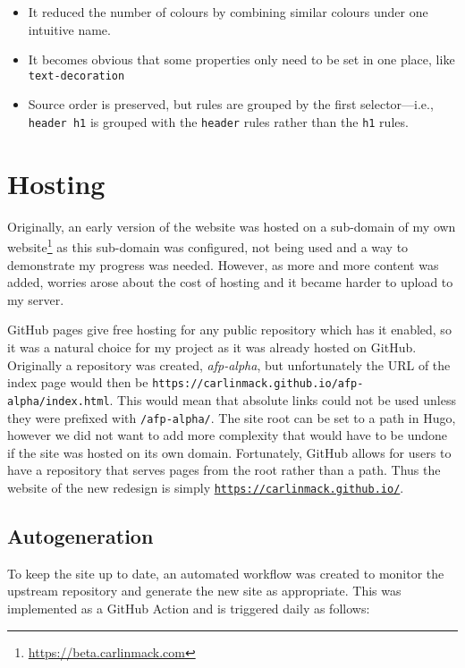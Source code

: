 \documentclass[bsc,frontabs,oneside,singlespacing,parskip,deptreport,logo]{infthesis}
\begin{document}
\begin{itemize}
    \item It reduced the number of colours by combining similar colours under one intuitive name.
    \item It becomes obvious that some properties only need to be set in one place, like \verb|text-decoration|
    \item Source order is preserved, but rules are grouped by the first selector---i.e., \verb|header h1| is grouped with the \verb|header| rules rather than the \verb|h1| rules. %
\end{itemize}

\section{Hosting}

Originally, an early version of the website was hosted on a sub-domain of my own website\footnote{\url{https://beta.carlinmack.com}} as this sub-domain was configured, not being used and a way to demonstrate my progress was needed. However, as more and more content was added, worries arose about the cost of hosting and it became harder to upload to my server.

GitHub pages give free hosting for any public repository which has it enabled, so it was a natural choice for my project as it was already hosted on GitHub. Originally a repository was created, \textit{afp-alpha}, but unfortunately the URL of the index page would then be \verb|https://carlinmack.github.io/afp-alpha/index.html|. This would mean that absolute links could not be used unless they were prefixed with \verb|/afp-alpha/|. The site root can be set to a path in Hugo, however we did not want to add more complexity that would have to be undone if the site was hosted on its own domain. Fortunately, GitHub allows for users to have a repository that serves pages from the root rather than a path. Thus the website of the new redesign is simply \texttt{\url{https://carlinmack.github.io/}}.

\subsection{Autogeneration}

To keep the site up to date, an automated workflow was created to monitor the upstream repository and generate the new site as appropriate. This was implemented as a GitHub Action and is triggered daily as follows:
\end{document}
